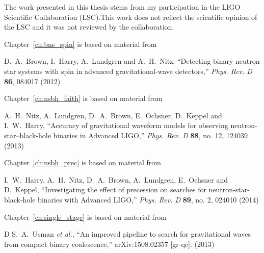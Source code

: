 
The work presented in this thesis stems from my participation in the
LIGO Scientific Collaboration (LSC).This work does not reflect the
scientific opinion of the LSC and it was not
reviewed by the collaboration.

\vspace*{0.5cm}

\noindent Chapter~\ref{ch:bns_spin} is based on material from

\vspace*{0.25cm}

\noindent   D.~A.~Brown, I.~Harry, A.~Lundgren and A.~H.~Nitz,
``Detecting binary neutron star systems with spin in advanced gravitational-wave detectors,''
{\it Phys. Rev. D} {\bf 86}, 084017 (2012)

\vspace*{0.5cm}

\noindent Chapter~\ref{ch:nsbh_faith} is based on material from

\vspace*{0.25cm}

\noindent    A.~H.~Nitz, A.~Lundgren, D.~A.~Brown, E.~Ochsner, D.~Keppel and I.~W.~Harry,
``Accuracy of gravitational waveform models for observing neutron-star–black-hole binaries in Advanced LIGO,''
{\it Phys. Rev. D} {\bf 88}, no. 12, 124039 (2013)
\vspace*{0.5cm}

\noindent Chapter~\ref{ch:nsbh_prec} is based on material from

\vspace*{0.25cm}

\noindent   I.~W.~Harry, A.~H.~Nitz, D.~A.~Brown, A.~Lundgren, E.~Ochsner and D.~Keppel,
``Investigating the effect of precession on searches for neutron-star-black-hole binaries with Advanced LIGO,''
{\it Phys. Rev. D} {\bf 89}, no. 2, 024010 (2014)

\vspace*{0.5cm}

\noindent Chapter~\ref{ch:single_stage} is based on material from

\vspace*{0.25cm}

\noindent D  S.~A.~Usman {\it et al.}, ``An improved pipeline to search for gravitational waves from compact binary coalescence,''
 arXiv:1508.02357 [gr-qc]. (2013)

\vspace*{0.5cm}

